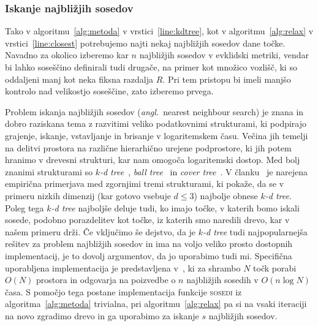 \documentclass[a4paper,twoside]{article}
\theoremstyle{definition} %
\theoremstyle{plain} %
\numberwithin{equation}{section}
\newcommand{\ang}[1]{(\textit{angl.}\ #1)}
\begin{document}
\subsubsection{Iskanje najbližjih sosedov}

Tako v algoritmu~\ref{alg:metoda} v vrstici~\ref{line:kdtree}, kot v
algoritmu~\ref{alg:relax} v vrstici~\ref{line:closest} potrebujemo
najti nekaj najbližjih sosedov dane točke. Navadno za okolico izberemo kar
$n$ najbližjih sosedov v evklidski metriki, vendar bi lahko soseščino definirali
tudi drugače, na primer kot množico vozlišč, ki so oddaljeni manj kot neka
fiksna razdalja $R$.  Pri tem pristopu bi imeli manjšo kontrolo nad velikostjo
soseščine, zato izberemo prvega.

Problem iskanja najbližjih sosedov \ang{nearest neighbour search} je znana in
dobro raziskana tema z razvitimi veliko podatkovnimi strukturami, ki podpirajo
grajenje, iskanje, vstavljanje in brisanje v logaritemskem času. Večina jih
temelji na delitvi prostora na različne hierarhično urejene podprostore, ki jih
potem hranimo v drevesni strukturi, kar nam omogoča logaritemski dostop. Med
bolj znanimi strukturami so \emph{$k$-d tree}~\cite{moore1991intoductory},
\emph{ball tree}~\cite{omohundro1989five} in \emph{cover
tree}~\cite{beygelzimer2006cover}. V članku~\cite{kibriya2007empirical} je
narejena empirična primerjava med zgornjimi tremi strukturami, ki pokaže, da
se v primeru nizkih dimenzij (kar gotovo vsebuje $d \leq 3$) najbolje obnese
\emph{$k$-d tree}. Poleg tega \emph{$k$-d tree} najboljše deluje tudi, ko imajo
točke, v katerih bomo iskali sosede, podobno porazdelitev kot točke, iz katerih
smo naredili drevo, kar v našem primeru drži. Če vključimo še dejstvo, da je
\emph{$k$-d tree} tudi najpopularnejša rešitev za problem najbližjih sosedov
in ima na voljo veliko prosto dostopnih implementacij, je to dovolj argumentov,
da jo uporabimo tudi mi. Specifična uporabljena implementacija je predstavljena
v~\cite{mount1998ann}, ki za shrambo $N$ točk porabi $O(N)$ prostora in
odgovarja na poizvedbe o $n$ najbližjih sosedih v $O(n\log N)$ časa.
S pomočjo tega postane implementacija funkcije \textsc{sosedi} iz
algoritma~\ref{alg:metoda} trivialna, pri algoritmu~\ref{alg:relax} pa si na
vsaki iteraciji na novo zgradimo drevo in ga uporabimo za iskanje $s$ najbližjih
sosedov.
\end{document}
